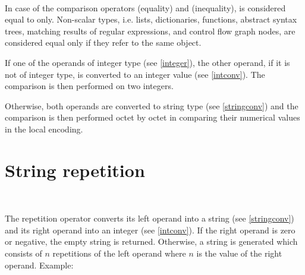\begin{grammar}
      \produces {} \\
      \produces {}
         \lextoken{==}  \\
      \produces {}
         \lextoken{!=}  \\
      \produces {}
         \lextoken{<}  \\
      \produces {}
         \lextoken{<=}  \\
      \produces {}
         \lextoken{>=}  \\
      \produces {}
         \lextoken{>} 
\end{grammar}

\noindent
In case of the comparison operators \token{==} (equality)
and \token{!=} (inequality),  is considered equal
to  only. Non-scalar types, i.e. lists, dictionaries,
functions, abstract syntax trees, matching results of regular
expressions, and control flow graph nodes, are considered equal
only if they refer to the same object.

If one of the operands of integer type (see \ref{integer}),
the other operand, if it is not of integer type, is converted to an
integer value (see \ref{intconv}). The comparison is then performed
on two integers.

Otherwise, both operands are converted to string type (see \ref{stringconv})
and the comparison is then performed octet by octet in comparing
their numerical values in the local encoding.

\section{String repetition}

\begin{grammar}
      \produces {} \\
      \produces {}
          
\end{grammar}

\noindent
The repetition operator  converts its left operand into a string
(see \ref{stringconv}) and its right operand into an integer
(see \ref{intconv}). If the right operand is zero or negative,
the empty string is returned. Otherwise, a string is generated
which consists of $n$ repetitions of the left operand where
$n$ is the value of the right operand. Example:

